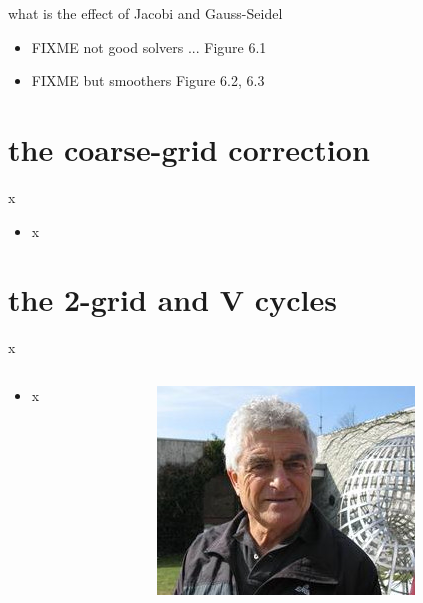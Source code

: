\documentclass[10pt,
               svgnames,
               hyperref={colorlinks,citecolor=DeepPink4,linkcolor=FireBrick,urlcolor=Maroon},
               usepdftitle=false]{beamer}
\begin{document}
\begin{frame}{what is the effect of Jacobi and Gauss-Seidel}
\begin{itemize}
\item FIXME not good solvers ... Figure 6.1
\item FIXME but smoothers Figure 6.2, 6.3
\end{itemize}
\end{frame}


\section{the coarse-grid correction}

\begin{frame}{x}
\begin{itemize}
\item x
\end{itemize}
\end{frame}



\section{the 2-grid and V cycles}

\begin{frame}{x}
\begin{columns}
\begin{column}{0.8\textwidth}
\begin{itemize}
\item x
\end{itemize}
\end{column}
\begin{column}{0.17\textwidth}
\hfill \includegraphics[width=\textwidth]{images/abrandt.jpg}
\end{column}
\end{columns}
\end{frame}
\end{document}

